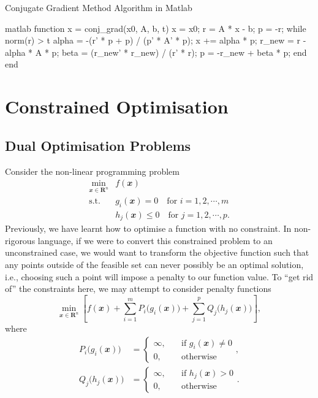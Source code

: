 \documentclass[math, code]{amznotes}
\theoremstyle{remark}
\begin{document}
\begin{codebox}{Conjugate Gradient Method Algorithm in Matlab}{}
    \begin{amzcode}{matlab}
function x = conj_grad(x0, A, b, t)
    x = x0;
    r = A * x - b;
    p = -r;
    while norm(r) > t
        alpha = -(r' * p + p) / (p' * A' * p);
        x += alpha * p;
        r_new = r - alpha * A * p;
        beta = (r_new' * r_new) / (r' * r);
        p = -r_new + beta * p;
    end
end
    \end{amzcode}
\end{codebox}
\chapter{Constrained Optimisation}
\section{Dual Optimisation Problems}
Consider the non-linear programming problem
\begin{align*}
    \min_{\mathbfit{x} \in \mathbf{R}^n} & f(\mathbfit{x}) \\
    \textrm{s.t. } & g_i(\mathbfit{x}) = 0 \quad\textrm{for } i = 1, 2, \cdots, m \\
    & h_j(\mathbfit{x}) \leq 0 \quad\textrm{for } j = 1, 2, \cdots, p.
\end{align*}
Previously, we have learnt how to optimise a function with no constraint. In non-rigorous language, if we were to convert this constrained problem to an unconstrained case, we would want to transform the objective function such that any points outside of the feasible set can never possibly be an optimal solution, i.e., choosing such a point will impose a penalty to our function value. To ``get rid of'' the constraints here, we may attempt to consider penalty functions
\begin{equation*}
    \min_{\mathbfit{x} \in \mathbf{R}^n} \left[f(\mathbfit{x}) + \sum_{i = 1}^{m}P_i\bigl(g_i(\mathbfit{x})\bigr) + \sum_{j = 1}^{p}Q_j\bigl(h_j(\mathbfit{x})\bigr)\right],
\end{equation*}
where 
\begin{align*}
    P_i\bigl(g_i(\mathbfit{x})\bigr) & = \begin{cases}
        \infty, & \quad\textrm{if } g_i(\mathbfit{x}) \neq 0 \\
        0, & \quad\textrm{otherwise}
    \end{cases}, \\
    Q_j\bigl(h_j(\mathbfit{x})\bigr) & = \begin{cases}
        \infty, & \quad\textrm{if } h_j(\mathbfit{x}) > 0 \\
        0, & \quad\textrm{otherwise}
    \end{cases}.
\end{align*}
\end{document}
